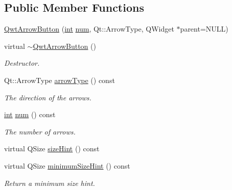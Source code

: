 \subsection*{Public Member Functions}
\begin{DoxyCompactItemize}
\item 
\hyperlink{class_qwt_arrow_button_ab0ad5aefdd56db10976796be717671e9}{Qwt\-Arrow\-Button} (\hyperlink{ioapi_8h_a787fa3cf048117ba7123753c1e74fcd6}{int} \hyperlink{glext_8h_abb50fc1ead3a02a46fb52daa2045f95c}{num}, Qt\-::\-Arrow\-Type, Q\-Widget $\ast$parent=N\-U\-L\-L)
\item 
virtual \hyperlink{class_qwt_arrow_button_a506ab071fa7ee92928ace7dcea774a73}{$\sim$\-Qwt\-Arrow\-Button} ()
\begin{DoxyCompactList}\small\item\em Destructor. \end{DoxyCompactList}\item 
Qt\-::\-Arrow\-Type \hyperlink{class_qwt_arrow_button_a0a2a1b7dfff38ef00a0495fcb61d21a4}{arrow\-Type} () const 
\begin{DoxyCompactList}\small\item\em The direction of the arrows. \end{DoxyCompactList}\item 
\hyperlink{ioapi_8h_a787fa3cf048117ba7123753c1e74fcd6}{int} \hyperlink{class_qwt_arrow_button_a09ae0f534912a14155233d7f431ffb2e}{num} () const 
\begin{DoxyCompactList}\small\item\em The number of arrows. \end{DoxyCompactList}\item 
virtual Q\-Size \hyperlink{class_qwt_arrow_button_a180ca16baa83c02e8dca4ffbe3dba2e8}{size\-Hint} () const 
\item 
virtual Q\-Size \hyperlink{class_qwt_arrow_button_a5bc3817732a253bb214a94d1c76508ce}{minimum\-Size\-Hint} () const 
\begin{DoxyCompactList}\small\item\em Return a minimum size hint. \end{DoxyCompactList}\end{DoxyCompactItemize}
